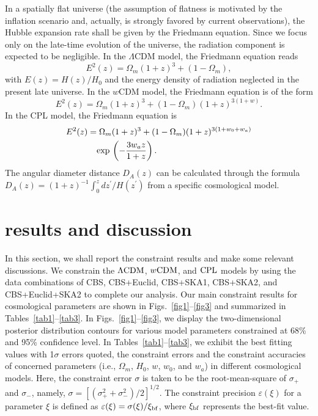 \documentclass[aps,prd,amsmath,amssymb,showpacs,floats,floatfix,nofootinbib,reprint]{revtex4-1}
\begin{document}
In a spatially flat universe (the assumption of flatness is motivated by the inflation scenario and, actually, is strongly favored by current observations), the Hubble expansion rate shall be given by the Friedmann equation. Since we focus only on the late-time evolution of the universe, the {radiation} component is expected to be negligible. In the $\Lambda$CDM model, the Friedmann equation reads 
\begin{equation*}
E^{2}(z)=\Omega_{m}(1+z)^{3}+(1-\Omega_{m}),
\end{equation*}
with $E(z)=H(z)/H_{0}$ and the energy density of radiation neglected in the present late universe. In the $w$CDM model, the Friedmann equation is of the form
\begin{equation*}
E^{2}(z)=\Omega_{m}(1+z)^{3}+(1-\Omega_{m})(1+z)^{3(1+w)}.
\end{equation*} 
In the CPL model, the Friedmann equation is
\begin{align*}
E^{2}(z)= & \;\Omega_{m}(1+z)^{3}+(1-\Omega_{m})(1+z)^{3(1+w_{0}+w_{a})}\\
 & {\rm exp}\,\left(-\frac{3w_{a}z}{1+z}\right).
\end{align*}
The angular diameter distance $D_{A}(z)$ can be calculated through the formula $D_{A}(z)=(1+z)^{-1}\int^{z}_{0}dz^{\prime}/H(z^{\prime})$ from a specific cosmological model.

\section{results and discussion}
In this section, we shall report the constraint results and make some relevant discussions. We constrain the ${\rm \Lambda CDM}$, ${ w\rm CDM}$, and ${\rm CPL}$ models by using the data combinations of CBS, CBS+Euclid, CBS+SKA1, CBS+SKA2, and CBS+Euclid+SKA2 to complete our analysis. Our main constraint results for cosmological parameters are shown in Figs.~\ref{fig1}--\ref{fig3} and summarized in Tables~\ref{tab1}--\ref{tab3}. In Figs.~\ref{fig1}--\ref{fig3}, we display the two-dimensional posterior distribution contours for various model parameters constrained at 68\% and 95\% confidence level. In Tables~\ref{tab1}--\ref{tab3}, we exhibit the best fitting values with 1$\sigma$ errors quoted, the constraint errors and the constraint accuracies of concerned parameters (i.e., $\Omega_{m}$, $H_{0}$, $w$, $w_{0}$, and $w_{a}$) in different cosmological models. Here, the constraint error $\sigma$ is taken to be the root-mean-square of $\sigma_{+}$ and $\sigma_{-}$, namely, $\sigma=[(\sigma_{+}^{2}+\sigma_{-}^{2})/2]^{1/2}$. The constraint precision $\varepsilon (\xi)$ for a parameter $\xi$ is defined as $\varepsilon (\xi)=\sigma(\xi)/\xi_{\rm bf}$, where $\xi_{\rm bf}$ represents the best-fit value. 
\end{document}
